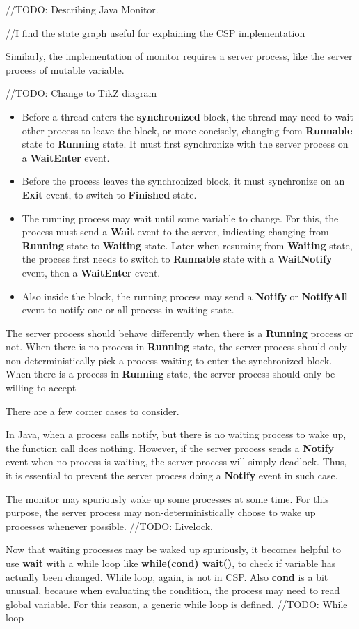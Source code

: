 //TODO: Describing Java Monitor.

//I find the state graph useful for explaining the CSP implementation

Similarly, the implementation of monitor requires a server process, like the server process of mutable variable.

//TODO: Change to TikZ diagram
\begin{itemize}
    \item Before a thread enters the \textbf{synchronized} block, the thread may need to wait other process to leave the block, or more concisely, changing from \textbf{Runnable} state to \textbf{Running} state. It must first synchronize with the server process on a \textbf{WaitEnter} event.
    \item Before the process leaves the synchronized block, it must synchronize on an \textbf{Exit} event, to switch to \textbf{Finished} state.
    \item The running process may wait until some variable to change. For this, the process must send a \textbf{Wait} event to the server, indicating changing from \textbf{Running} state to \textbf{Waiting} state. Later when resuming from \textbf{Waiting} state, the process first needs to switch to \textbf{Runnable} state with a \textbf{WaitNotify} event, then a \textbf{WaitEnter} event.
    \item Also inside the block, the running process may send a \textbf{Notify} or \textbf{NotifyAll} event to notify one or all process in waiting state.
\end{itemize}

The server process should behave differently when there is a \textbf{Running} process or not. When there is no process in \textbf{Running} state, the server process should only non-deterministically pick a process waiting to enter the synchronized block. When there is a process in \textbf{Running} state, the server process should only be willing to accept 

There are a few corner cases to consider.

In Java, when a process calls notify, but there is no waiting process to wake up, the function call does nothing. However, if the server process sends a \textbf{Notify} event when no process is waiting, the server process will simply deadlock. Thus, it is essential to prevent the server process doing a \textbf{Notify} event in such case.

 
The monitor may spuriously wake up some processes at some time. For this purpose, the server process may non-deterministically choose to wake up processes whenever possible. //TODO: Livelock.

Now that waiting processes may be waked up spuriously, it becomes helpful to use \textbf{wait} with a while loop like \textbf{while(cond) wait()}, to check if variable has actually been changed. While loop, again, is not in CSP. Also \textbf{cond} is a bit unusual, because when evaluating the condition, the process may need to read global variable. For this reason, a generic while loop is defined. //TODO: While loop
